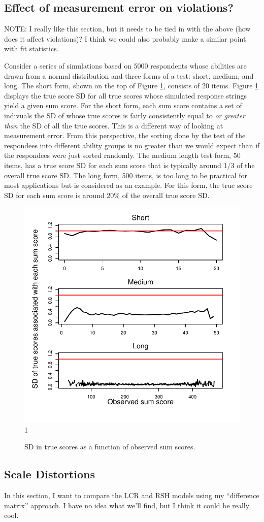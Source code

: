 \documentclass[12pt]{article}
\newcommand{\putbib}[1]{


}
\begin{document}
\subsection{Effect of measurement error on violations?}
NOTE: I really like this section, but it needs to be tied in with the above (how does it affect violations)? I think we could also probably make a similar point with fit statistics. 

Consider a series of simulations based on 5000 respondents whose abilities are drawn from a normal distribution and three forms of a test: short, medium, and long. The short form, shown on the top of Figure \ref{noise}, consists of 20 items. Figure \ref{noise} displays the true score SD for all true scores whose simulated response strings yield a given sum score. For the short form, each sum score contains a set of indivuals the SD of whose true scores is fairly consistently equal to {\em or greater than} the SD of all the true scores. This is a different way of looking at measurement error. From this perspective, the sorting done by the test of the respondees into different ability groups is no greater than we would expect than if the respondees were just sorted randomly. The medium length test form, 50 items, has a true score SD for each sum score that is typically around 1/3 of the overall true score SD. The long form, 500 items, is too long to be practical for most applications but is considered as an example. For this form, the true score SD for each sum score is around 20\% of the overall true score SD.

\begin{figure}
\centering
\caption{SD in true scores as a function of observed sum scores.} \label{noise}
\includegraphics[width=\textwidth]{./figs/noise}1
\end{figure}

\subsection{Scale Distortions}
In this section, I want to compare the LCR and RSH models using my ``difference matrix'' approach. I have no idea what we'll find, but I think it could be really cool.


\putbib{conjoint}
\end{document}
